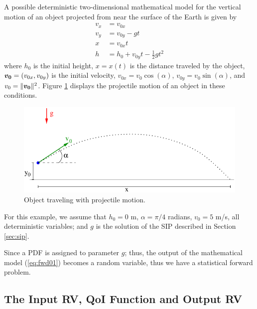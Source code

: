 A possible deterministic two-dimensional mathematical model for the vertical motion of an object projected from near the surface of the Earth is given by
\begin{align}\label{eq:fwd01}
v_x &= v_{0x} \\ %
v_y &= v_{0y} - gt \\ %
  x &= v_{0x}t \\ %
  h &= h_0 + v_{0y}t - \frac{1}{2} g t^2  %
\end{align}
where
$h_0$ is the initial height, $x=x(t)$ is the distance traveled by the object, $\mbox{\boldmath$ v_0 $}=(v_{0x},v_{0y})$ is the initial velocity,
$v_{0x} = v_{0} \cos(\alpha)$, $v_{0y} = v_{0} \sin(\alpha)$, and $v_0=\|\mbox{\boldmath$ v_0 $}\|^2$.
%
Figure \ref{fig:projectile} displays the projectile motion of an object in these conditions.
\begin{figure}[!h]
\centering
\includegraphics[scale=1]{rawfigs/projectile}
\vspace*{-8pt}
\caption{Object traveling with projectile motion. }
\label{fig:projectile}
\end{figure}




For this example, we assume that $h_0 =0$ m, $\alpha = \pi/4$ radians, $v_0 = 5$ m/s, all deterministic variables; and $g$ is the solution of the SIP described in Section \ref{sec:sip}.

Since a PDF is assigned to parameter $g$; thus, the output of the mathematical model (\ref{eq:fwd01}) becomes a random variable, thus we have a statistical forward problem. 

\subsection{The Input RV, QoI Function and Output RV}
 
